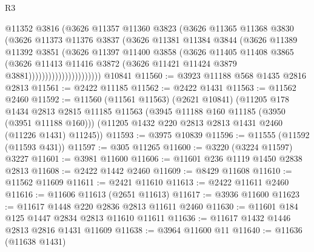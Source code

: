\begin{lexlean}{R3}
\begin{coremodule}
                              @11352
                              @3816
                              (@3626
                                @11357
                                @11360
                                @3823
                                (@3626
                                  @11365
                                  @11368
                                  @3830
                                  (@3626
                                    @11373
                                    @11376
                                    @3837
                                    (@3626
                                      @11381
                                      @11384
                                      @3844
                                      (@3626
                                        @11389
                                        @11392
                                        @3851
                                        (@3626
                                          @11397
                                          @11400
                                          @3858
                                          (@3626
                                            @11405
                                            @11408
                                            @3865
                                            (@3626
                                              @11413
                                              @11416
                                              @3872
                                              (@3626 @11421 @11424 @3879 @3881))))))))))))))))))))))
    @10841
@11560 := @3923 @11188 @568 @1435 @2816 @2813
@11561 := @2422 @11185
@11562 := @2422 @1431
@11563 := @11562 @2460
@11592 := @11560
    (@11561 @11563)
    (@2621 @10841)
    (@11205
      @178
      @1434
      @2813
      @2815
      @11185
      @11563
      (@3945 @11188 @160 @11185 (@3950 (@3951 @11188 @160)))
      (@11205 @1432 @220 @2813 @2813 @1431 @2460 (@11226 @1431) @11245))
@11593 := @3975 @10839
@11596 := @11555 (@11592 (@11593 @431))
@11597 := @305 @11265
@11600 := @3220 (@3224 @11597) @3227
@11601 := @3981 @11600
@11606 := @11601 @236 @1119 @1450 @2838 @2813
@11608 := @2422 @1442 @2460
@11609 := @8429 @11608
@11610 := @11562 @11609
@11611 := @2421 @11610
@11613 := @2422 @11611 @2460
@11616 := @11606 @11613 (@2651 @11613)
@11617 := @3936 @11600
@11623 := @11617 @1448 @220 @2836 @2813 @11611 @2460
@11630 := @11601 @184 @125 @1447 @2834 @2813 @11610 @11611
@11636 := @11617 @1432 @1446 @2813 @2816 @1431 @11609
@11638 := @3964 @11600 @11
@11640 := @11636 (@11638 @1431)

\end{coremodule}
\end{lexlean}
